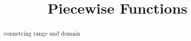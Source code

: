 \documentclass{ximera}
\title{Piecewise Functions}
\begin{document}
\begin{abstract}
connetcing range and domain
\end{abstract}
\maketitle
\end{document}

